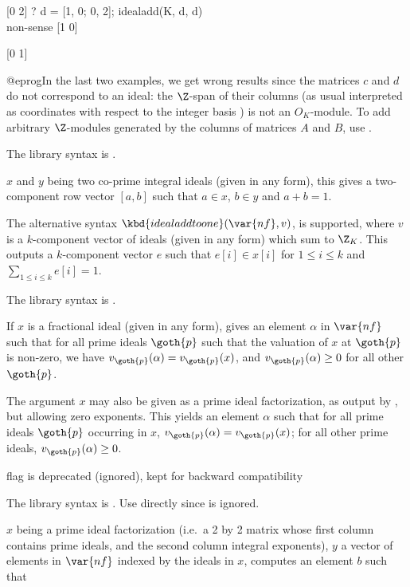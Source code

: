   [0 2]
  ? d = [1, 0; 0, 2]; idealadd(K, d, d)   \\ non-sense
  [1 0]

  [0 1]

@eprog\noindent In the last two examples, we get wrong results since the
matrices $c$ and $d$ do not correspond to an ideal: the $\Z$-span of their
columns (as usual interpreted as coordinates with respect to the integer basis
) is not an $O_K$-module. To add arbitrary $\Z$-modules generated
by the columns of matrices $A$ and $B$, use .

The library syntax is .

\label{se:idealaddtoone}
$x$ and $y$ being two co-prime
integral ideals (given in any form), this gives a two-component row vector
$[a,b]$ such that $a\in x$, $b\in y$ and $a+b=1$.

The alternative syntax $\kbd{idealaddtoone}(\var{nf},v)$, is supported, where
$v$ is a $k$-component vector of ideals (given in any form) which sum to
$\Z_K$. This outputs a $k$-component vector $e$ such that $e[i]\in x[i]$ for
$1\le i\le k$ and $\sum_{1\le i\le k}e[i]=1$.

The library syntax is .

\label{se:idealappr}
If $x$ is a fractional ideal
(given in any form), gives an element $\alpha$ in $\var{nf}$ such that for
all prime ideals $\goth{p}$ such that the valuation of $x$ at $\goth{p}$ is
non-zero, we have $v_{\goth{p}}(\alpha)=v_{\goth{p}}(x)$, and
$v_{\goth{p}}(\alpha)\ge0$ for all other $\goth{p}$.

The argument $x$ may also be given as a prime ideal factorization, as
output by , but allowing zero exponents.
This yields an element $\alpha$ such that for all prime ideals $\goth{p}$
occurring in $x$, $v_{\goth{p}}(\alpha) = v_{\goth{p}}(x)$;
for all other prime ideals, $v_{\goth{p}}(\alpha)\ge0$.

flag is deprecated (ignored), kept for backward compatibility

The library syntax is .
Use directly  since \fl is ignored.

\label{se:idealchinese}
$x$ being a prime ideal factorization
(i.e.~a 2 by 2 matrix whose first column contains prime ideals, and the second
column integral exponents), $y$ a vector of elements in $\var{nf}$ indexed by
the ideals in $x$, computes an element $b$ such that

